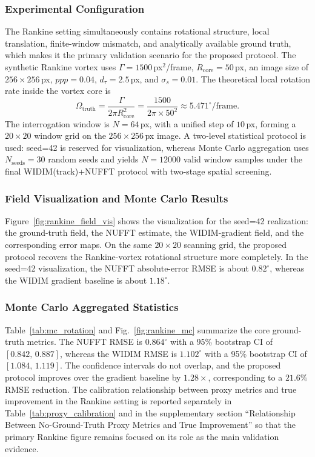 \documentclass[lettersize,journal]{IEEEtran}
\begin{document}
\subsubsection{Experimental Configuration}

The Rankine setting simultaneously contains rotational structure, local translation, finite-window mismatch, and analytically available ground truth,
which makes it the primary validation scenario for the proposed protocol.
The synthetic Rankine vortex uses
$\Gamma=1500\,$px$^2$/frame, $R_{\mathrm{core}}=50\,$px,
an image size of $256\times256\,$px, $ppp=0.04$, $d_\tau=2.5\,$px, and $\sigma_s=0.01$.
The theoretical local rotation rate inside the vortex core is
%
\begin{equation}
  \Omega_{\mathrm{truth}} = \frac{\Gamma}{2\pi R_{\mathrm{core}}^2}
  = \frac{1500}{2\pi\times 50^2}
  \approx 5.471^\circ/\mathrm{frame}.
  \label{eq:rankine_truth}
\end{equation}
%
The interrogation window is $N=64\,$px, with a unified step of $10\,$px,
forming a $20\times20$ window grid on the $256\times256\,$px image.
A two-level statistical protocol is used: seed=42 is reserved for visualization, whereas Monte Carlo aggregation uses $N_{\mathrm{seeds}}=30$ random seeds and yields $N=12000$ valid window samples under the final WIDIM(track)+NUFFT protocol with two-stage spatial screening.

\subsubsection{Field Visualization and Monte Carlo Results}

Figure~\ref{fig:rankine_field_vis} shows the visualization for the seed=42 realization:
the ground-truth field, the NUFFT estimate, the WIDIM-gradient field, and the corresponding error maps.
On the same $20\times20$ scanning grid,
the proposed protocol recovers the Rankine-vortex rotational structure more completely.
In the seed=42 visualization,
the NUFFT absolute-error RMSE is about $0.82^\circ$,
whereas the WIDIM gradient baseline is about $1.18^\circ$.

\subsubsection{Monte Carlo Aggregated Statistics}

Table~\ref{tab:mc_rotation} and Fig.~\ref{fig:rankine_mc}
summarize the core ground-truth metrics.
The NUFFT RMSE is $0.864^\circ$ with a 95\% bootstrap CI of $[0.842,\,0.887]$,
whereas the WIDIM RMSE is $1.102^\circ$ with a 95\% bootstrap CI of $[1.084,\,1.119]$.
The confidence intervals do not overlap,
and the proposed protocol improves over the gradient baseline by $1.28\times$,
corresponding to a $21.6\%$ RMSE reduction.
The calibration relationship between proxy metrics and true improvement in the Rankine setting
is reported separately in Table~\ref{tab:proxy_calibration} and in the supplementary section
``Relationship Between No-Ground-Truth Proxy Metrics and True Improvement''
so that the primary Rankine figure remains focused on its role as the main validation evidence.
\end{document}
